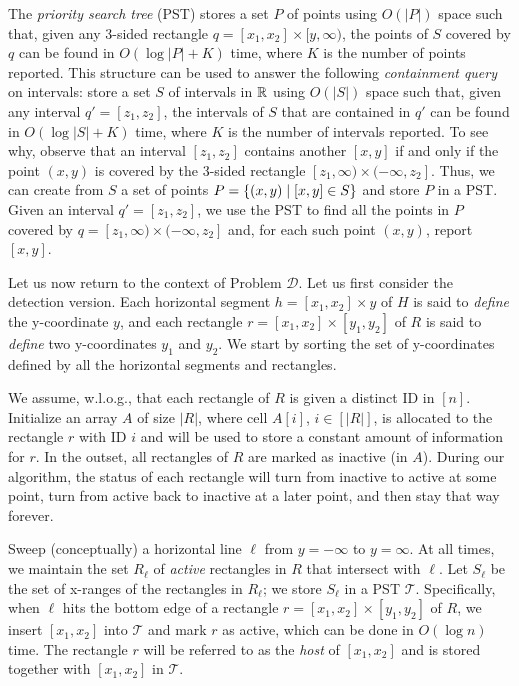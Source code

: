 \documentclass[sigconf]{acmart}
\def\vgap{\vspace{0mm}}
\def\extraspacing{\vspace{1.5mm} \noindent}
\def\T{\mathcal{T}}
\begin{document}
{{{\extraspacing {\bf Algorithm for Problem $\bm{\mathscr{D}}$.} The {\em priority search tree} (PST) \cite{m85} stores a set $P$ of points using $O(|P|)$ space such that, given any 3-sided rectangle $q = [x_1, x_2] \times [y, \infty)$, the points of $S$ covered by $q$ can be found in $O(\log |P| + K)$ time, where $K$ is the number of points reported. This structure can be used to answer the following {\em containment query} on intervals: store a set $S$ of intervals in $\mathbb{R}$ using $O(|S|)$ space such that, given any interval $q' = [z_1, z_2]$, the intervals of $S$ that are contained in $q'$ can be found in $O(\log |S| + K)$ time, where $K$ is the number of intervals reported. To see why, observe that an interval $[z_1, z_2]$ contains another $[x, y]$ if and only if the point $(x, y)$ is covered by the 3-sided rectangle $[z_1, \infty) \times (-\infty, z_2]$. Thus, we can create from $S$ a set of points $P = \{(x, y) \mid [x, y] \in S\}$ and store $P$ in a PST. Given an interval $q' = [z_1, z_2]$, we use the PST to find all the points in $P$ covered by $q = [z_1, \infty) \times (-\infty, z_2]$ and, for each such point $(x, y)$, report $[x, y]$.

\vgap

Let us now return to the context of Problem $\mathscr{D}$. Let us first consider the detection version. Each horizontal segment $h = [x_1, x_2] \times y$ of $H$ is said to {\em define} the y-coordinate $y$, and each rectangle $r = [x_1, x_2] \times [y_1, y_2]$ of $R$ is said to {\em define} two y-coordinates $y_1$ and $y_2$. We start by sorting the set of y-coordinates defined by all the horizontal segments and rectangles.

\vgap

We assume, w.l.o.g., that each rectangle of $R$ is given a distinct ID in $[n]$. Initialize an array $A$ of size $|R|$, where cell $A[i]$, $i \in [|R|]$, is allocated to the rectangle $r$ with ID $i$ and will be used to store a constant amount of information for $r$. In the outset, all rectangles of $R$ are marked as inactive (in $A$). During our algorithm, the status of each rectangle will turn from inactive to active at some point, turn from active back to inactive at a later point, and then stay that way forever.

\vgap

Sweep (conceptually) a horizontal line $\ell$ from $y = -\infty$ to $y = \infty$. At all times, we maintain the set $R_\ell$ of {\em active} rectangles in $R$ that intersect with $\ell$. Let $S_\ell$ be the set of x-ranges of the rectangles in $R_\ell$; we store $S_\ell$ in a PST $\T$. Specifically, when $\ell$ hits the bottom edge of a rectangle $r = [x_1, x_2] \times [y_1, y_2]$ of $R$, we insert $[x_1, x_2]$ into $\T$ and mark $r$ as active, which can be done in $O(\log n)$ time. The rectangle $r$ will be referred to as the {\em host} of $[x_1, x_2]$ and is stored together with $[x_1, x_2]$ in $\T$.

}}}
\end{document}
